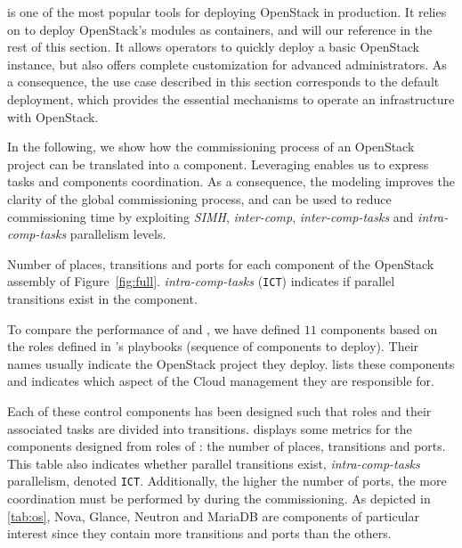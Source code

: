 \kolla is one of the most popular tools for deploying OpenStack in
production.  It relies on \ansible to deploy OpenStack's modules as
\docker containers, and will our reference in the
rest of this section.
It allows operators to quickly deploy a basic OpenStack instance, but
also offers complete customization for advanced
administrators. As a consequence, the use case described in this
section corresponds to the default \kolla deployment, which provides
the essential mechanisms to operate an infrastructure with OpenStack.

In the following, we show how the commissioning process of an
OpenStack project can be translated into a \mad component. Leveraging
\mad enables us to express tasks and components coordination. As a
consequence, the \mad modeling improves the clarity of the global
commissioning process, and can be used to reduce commissioning time by
exploiting \emph{SIMH}, \emph{inter-comp}, \emph{inter-comp-tasks}
and \emph{intra-comp-tasks} parallelism levels.

\begin{table}
  \begin{center}
    
    \caption{Number of places, transitions and ports for each \mad component
        of the OpenStack assembly of Figure~\ref{fig:full}. 
        \emph{intra-comp-tasks} (\texttt{ICT}) indicates if parallel transitions 
        exist in the component.}
    \label{tab:os}
  \end{center}
\end{table}

To compare the performance of \kolla and \mad, we have defined $11$
\mad components based on the \ansible roles defined in \kolla's
playbooks (\ie \ansible sequence of components to deploy). Their
names usually indicate the OpenStack project they deploy.
 lists these components and indicates which aspect of the
Cloud management they are responsible for.
%

Each of these control components has been designed such that \ansible roles and 
their associated tasks are divided into \mad transitions.  displays 
some metrics for the \mad components designed from \ansible roles of 
\kolla: the number of places, transitions and ports.
%
This table also indicates whether parallel transitions
exist, \ie \emph{intra-comp-tasks} parallelism,
denoted \texttt{ICT}. Additionally, the higher the number of ports, the
more coordination must be performed by \mad during the commissioning. As
depicted in \cref{tab:os}, Nova, Glance, Neutron and MariaDB are
components of particular interest since they contain more transitions
and ports than the others.

